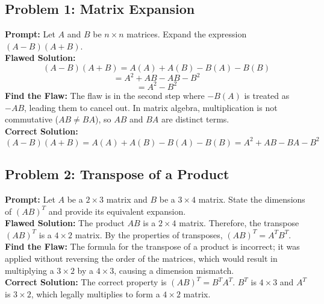\documentclass{article}
\begin{document}
\subsection*{Problem 1: Matrix Expansion}
\textbf{Prompt:} Let $A$ and $B$ be $n \times n$ matrices. Expand the expression $(A-B)(A+B)$. \\
\textbf{Flawed Solution:} 
\[ (A-B)(A+B) = A(A) + A(B) - B(A) - B(B) \]
\[ = A^2 + AB - AB - B^2 \]
\[ = A^2 - B^2 \]
\textbf{Find the Flaw:} The flaw is in the second step where $-B(A)$ is treated as $-AB$, leading them to cancel out. In matrix algebra, multiplication is not commutative ($AB \neq BA$), so $AB$ and $BA$ are distinct terms. \\
\textbf{Correct Solution:}
\[ (A-B)(A+B) = A(A) + A(B) - B(A) - B(B) = A^2 + AB - BA - B^2 \]

\subsection*{Problem 2: Transpose of a Product}
\textbf{Prompt:} Let $A$ be a $2 \times 3$ matrix and $B$ be a $3 \times 4$ matrix. State the dimensions of $(AB)^T$ and provide its equivalent expansion. \\
\textbf{Flawed Solution:} 
The product $AB$ is a $2 \times 4$ matrix. Therefore, the transpose $(AB)^T$ is a $4 \times 2$ matrix. By the properties of transposes, $(AB)^T = A^T B^T$. \\
\textbf{Find the Flaw:} The formula for the transpose of a product is incorrect; it was applied without reversing the order of the matrices, which would result in multiplying a $3 \times 2$ by a $4 \times 3$, causing a dimension mismatch. \\
\textbf{Correct Solution:}
The correct property is $(AB)^T = B^T A^T$. $B^T$ is $4 \times 3$ and $A^T$ is $3 \times 2$, which legally multiplies to form a $4 \times 2$ matrix.
\end{document}
